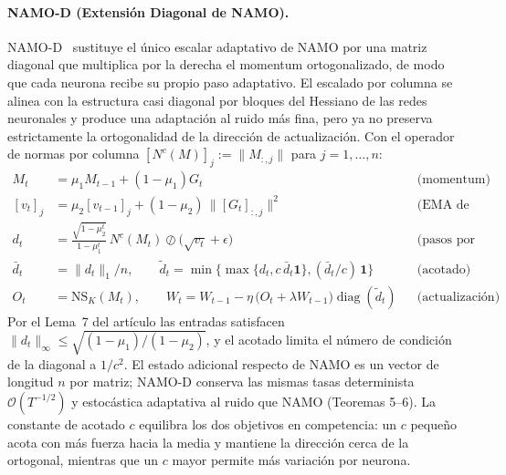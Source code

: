 \paragraph{NAMO-D (Extensión Diagonal de NAMO).}
NAMO-D~\citep{zhang_namo_2026} sustituye el único escalar adaptativo de NAMO por una
matriz diagonal que multiplica por la derecha el momentum ortogonalizado, de modo que
cada neurona recibe su propio paso adaptativo. El escalado por columna se alinea con la
estructura casi diagonal por bloques del Hessiano de las redes neuronales y produce una
adaptación al ruido más fina, pero ya no preserva estrictamente la ortogonalidad de la
dirección de actualización. Con el operador de normas por columna
$[N^c(M)]_j := \lVert M_{:,j}\rVert$ para $j=1,\dots,n$:
\begin{align}
M_t &= \mu_1 M_{t-1} + (1-\mu_1) G_t && \text{(momentum)} \\
[v_t]_j &= \mu_2 [v_{t-1}]_j + (1-\mu_2)\,\lVert [G_t]_{:,j}\rVert^2 && \text{(EMA de normas por columna)} \\
d_t &= \frac{\sqrt{1-\mu_2^t}}{1-\mu_1^t}\,N^c(M_t) \oslash \bigl(\sqrt{v_t}+\epsilon\bigr) && \text{(pasos por columna)} \\
\bar d_t &= \lVert d_t\rVert_1/n, \qquad
\tilde d_t = \min\bigl\{\max\{d_t, c\,\bar d_t \mathbf 1\}, (\bar d_t/c)\,\mathbf 1\bigr\} && \text{(acotado)} \\
O_t &= \mathrm{NS}_K(M_t), \qquad
W_t = W_{t-1} - \eta\,\bigl(O_t + \lambda W_{t-1}\bigr)\operatorname{diag}(\tilde d_t) && \text{(actualización)}
\end{align}
Por el Lema~7 del artículo las entradas satisfacen
$\lVert d_t\rVert_\infty \le \sqrt{(1-\mu_1)/(1-\mu_2)}$, y el acotado limita el número
de condición de la diagonal a $1/c^2$. El estado adicional respecto de NAMO es un
vector de longitud $n$ por matriz; NAMO-D conserva las mismas tasas determinista
$\mathcal{O}(T^{-1/2})$ y estocástica adaptativa al ruido que NAMO (Teoremas 5--6). La
constante de acotado $c$ equilibra los dos objetivos en competencia: un $c$ pequeño
acota con más fuerza hacia la media y mantiene la dirección cerca de la ortogonal,
mientras que un $c$ mayor permite más variación por neurona.

